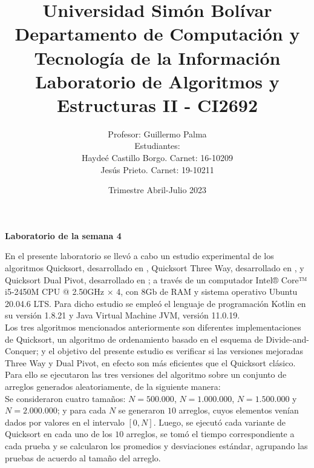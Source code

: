 \documentclass{article}
\begin{document}
	\title{\normalsize{Universidad Sim\'on Bol\'ivar\\
			Departamento de Computaci\'on y Tecnolog\'ia de la Informaci\'on\\
			Laboratorio de Algoritmos y Estructuras II - CI2692}}
	\author{\normalsize{Profesor: Guillermo Palma}\\
		\normalsize{Estudiantes:}\\
		\normalsize{Hayde\'e Castillo Borgo. Carnet: 16-10209}\\
		\normalsize{Jes\'us Prieto. Carnet: 19-10211}}
	\date{\normalsize{Trimestre Abril-Julio 2023}}
	\maketitle
	\begin{center}
		\Large{\textbf{Laboratorio de la semana 4}}
	\end{center}\:
	
	En el presente laboratorio se llev\'o a cabo un estudio experimental de los algoritmos Quicksort, desarrollado en \cite{1}, Quicksort Three Way, desarrollado en \cite{2}, y Quicksort Dual Pivot, desarrollado en \cite{3}; a trav\'es de un computador Intel® Core™ i5-2450M CPU @ 2.50GHz × 4, con 8Gb de RAM y sistema operativo Ubuntu 20.04.6 LTS. Para dicho estudio se emple\'o el lenguaje de programaci\'on Kotlin en su versi\'on 1.8.21 y Java Virtual Machine JVM, versi\'on 11.0.19.\\
	
	Los tres algoritmos mencionados anteriormente son diferentes implementaciones de Quicksort, un algoritmo de ordenamiento basado en el esquema de Divide-and-Conquer; y el objetivo del presente estudio es verificar si las versiones mejoradas Three Way y Dual Pivot, en efecto son m\'as eficientes que el Quicksort cl\'asico.\\
	
	Para ello se ejecutaron las tres versiones del algoritmo sobre un conjunto de arreglos generados aleatoriamente, de la siguiente manera:\\
	
	Se consideraron cuatro tamaños: $N = 500.000$, $N = 1.000.000$, $N = 1.500.000$ y $N = 2.000.000$; y para cada $N$ se generaron $10$ arreglos, cuyos elementos ven\'ian dados por valores en el intervalo $[0,N]$. Luego, se ejecut\'o cada variante de Quicksort en cada uno de los $10$ arreglos, se tom\'o el tiempo correspondiente a cada prueba y se calcularon los promedios y desviaciones est\'andar, agrupando las pruebas de acuerdo al tamaño del arreglo.\\
	
\end{document}
